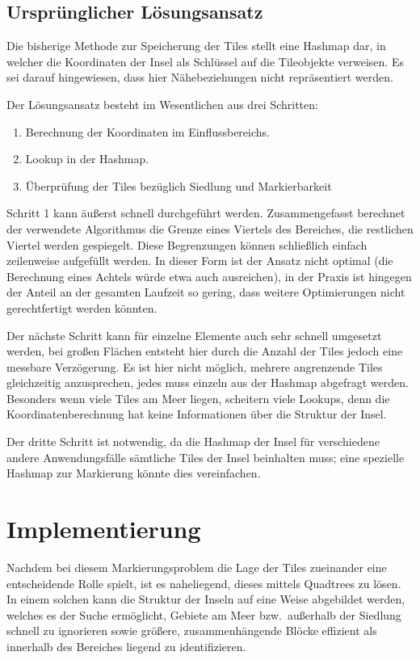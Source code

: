 \documentclass[%
			paper=a4,%
			DIV12,
			liststotoc,
			bibtotoc,
			draft=false,%
			titlepage
			]{scrartcl}
\begin{document}
\subsection{Ursprünglicher Lösungsansatz}

Die bisherige Methode zur Speicherung der Tiles stellt eine Hashmap dar, in welcher die Koordinaten der Insel als Schlüssel auf die Tileobjekte verweisen. 
Es sei darauf hingewiesen, dass hier Nähebeziehungen nicht repräsentiert werden.

Der Lösungsansatz besteht im Wesentlichen aus drei Schritten:
\begin{enumerate}
	\item Berechnung der Koordinaten im Einflussbereichs.
	\item Lookup in der Hashmap.
	\item Überprüfung der Tiles bezüglich Siedlung und Markierbarkeit  
\end{enumerate}

Schritt 1 kann äußerst schnell durchgeführt werden.
Zusammengefasst berechnet der verwendete Algorithmus die Grenze eines Viertels des Bereiches, die restlichen Viertel werden gespiegelt.
Diese Begrenzungen können schließlich einfach zeilenweise aufgefüllt werden.
In dieser Form ist der Ansatz nicht optimal (die Berechnung eines Achtels würde etwa auch \mbox{ausreichen}), in der Praxis ist hingegen der Anteil an der gesamten Laufzeit so gering, dass weitere Optimierungen nicht gerechtfertigt werden könnten.

Der nächste Schritt kann für einzelne Elemente auch sehr schnell umgesetzt werden, bei großen Flächen entsteht hier durch die Anzahl der Tiles jedoch eine messbare Verzögerung.
Es ist hier nicht möglich, mehrere angrenzende Tiles gleichzeitig anzusprechen, jedes muss einzeln aus der Hashmap abgefragt werden.
Besonders wenn viele Tiles am Meer liegen, scheitern viele Lookups, denn die Koordinatenberechnung hat keine Informationen über die Struktur der Insel.

Der dritte Schritt ist notwendig, da die Hashmap der Insel für verschiedene andere Anwendungsfälle sämtliche Tiles der Insel beinhalten muss; eine spezielle Hashmap zur Markierung könnte dies vereinfachen.

\section{Implementierung}
Nachdem bei diesem Markierungsproblem die Lage der Tiles zueinander eine entscheidende Rolle spielt, ist es naheliegend, dieses mittels Quadtrees zu lösen.
In einem solchen kann die Struktur der Inseln auf eine Weise abgebildet werden,
welches es der Suche ermöglicht, Gebiete am Meer bzw.\ außerhalb der Siedlung schnell zu ignorieren sowie größere, zusammenhängende Blöcke effizient als innerhalb des Bereiches liegend zu identifizieren.
\end{document}
